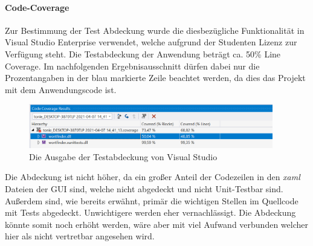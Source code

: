 \paragraph{Code-Coverage} Zur Bestimmung der Test Abdeckung wurde die diesbezügliche Funktionalität in Visual Studio Enterprise verwendet, welche aufgrund der Studenten Lizenz zur Verfügung steht. Die Testabdeckung der Anwendung beträgt ca. 50\% Line Coverage. Im nachfolgenden Ergebnisausschnitt dürfen dabei nur die Prozentangaben in der blau markierte Zeile beachtet werden, da dies das Projekt mit dem Anwendungscode ist.

\begin{figure}[!htb]
\centering
\includegraphics[width=0.95\textwidth]{Bilder/Testabdeckung.PNG}
\caption{\label{Abb:Testabdeckung}Die Ausgabe der Testabdeckung von Visual Studio}
\end{figure}

Die Abdeckung ist nicht höher, da ein großer Anteil der Codezeilen in den \textit{xaml} Dateien der GUI sind, welche nicht abgedeckt und nicht Unit-Testbar sind. Außerdem sind, wie bereits erwähnt, primär die wichtigen Stellen im Quellcode mit Tests abgedeckt. Unwichtigere werden eher vernachlässigt. Die Abdeckung könnte somit noch erhöht werden, wäre aber mit viel Aufwand verbunden welcher hier als nicht vertretbar angesehen wird.

\endinput